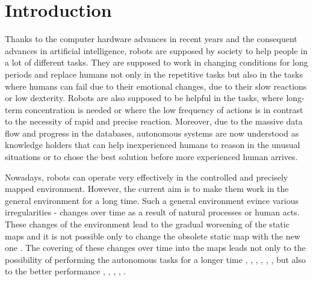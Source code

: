 \section{Introduction}

Thanks to the computer hardware advances in recent years and the consequent advances in artificial intelligence, robots are supposed by society to help people in a lot of different tasks.
They are supposed to work in changing conditions for long periods and replace humans not only in the repetitive tasks but also in the tasks where humans can fail due to their emotional changes, due to their slow reactions or low dexterity.
Robots are also supposed to be helpful in the tasks, where long-term concentration is needed or where the low frequency of actions is in contrast to the necessity of rapid and precise reaction.
Moreover, due to the massive data flow and progress in the databases, autonomous systems are now understood as knowledge holders that can help inexperienced humans to reason in the unusual situations or to chose the best solution before more experienced human arrives.

Nowadays, robots can operate very effectively in the controlled and precisely mapped environment.
However, the current aim is to make them work in the general environment for a long time.
Such a general environment evince various irregularities - changes over time as a result of natural processes or human acts.
These changes of the environment lead to the gradual worsening of the static maps and it is not possible only to change the obsolete static map with the new one \cite{Dayoub2009adaptive}.
The covering of these changes over time into the maps leads not only to the possibility of performing the autonomous tasks for a longer time \cite{biber2009experimental}, \cite{tipaldi2013lifelong}, \cite{kucner2013conditional}, \cite{krajnik2017fremen}, \cite{churchill2013experience}, \cite{konolige2009towards}, \cite{hochdorfer2009towards}
 but also to the better performance \cite{hawes2017strands}, \cite{santos2016lifelong}, \cite{kunze2018artificial}, \cite{santos2017spatio}, \cite{hanheide2017and}.

